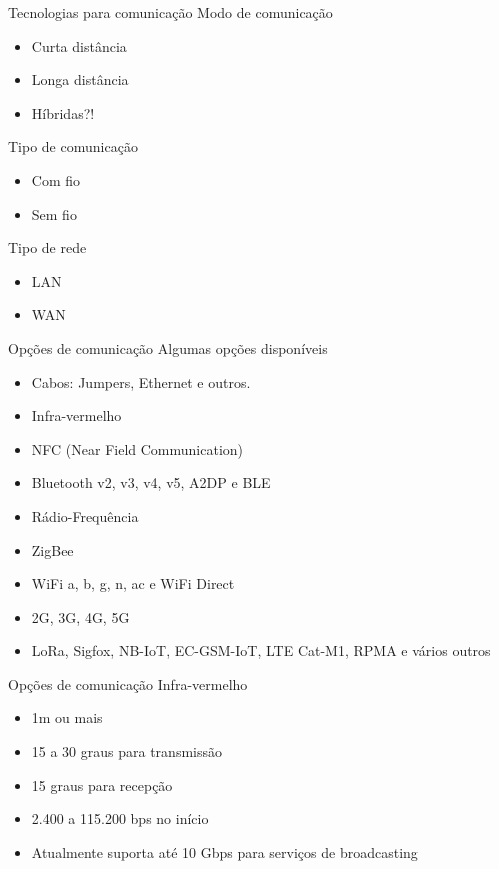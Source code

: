 \documentclass[t]{beamer}
\begin{document}
\begin{frame}{Tecnologias para comunicação}
Modo de comunicação
\begin{itemize}
	\item Curta distância
	\item Longa distância
	\item Híbridas?!
\end{itemize}
Tipo de comunicação
\begin{itemize}
	\item Com fio
	\item Sem fio
\end{itemize}
Tipo de rede
\begin{itemize}
	\item LAN
	\item WAN
\end{itemize}
\end{frame}


\begin{frame}{Opções de comunicação}
Algumas opções disponíveis
\begin{itemize}
	\item Cabos: Jumpers, Ethernet e outros.
	\item Infra-vermelho
	\item NFC (Near Field Communication)
	\item Bluetooth v2, v3, v4, v5, A2DP e BLE
	\item Rádio-Frequência
	\item ZigBee
	\item WiFi a, b, g, n, ac e WiFi Direct
	\item 2G, 3G, 4G, 5G
	\item LoRa, Sigfox, NB-IoT, EC-GSM-IoT, LTE Cat-M1, RPMA e vários outros
\end{itemize}

\end{frame}

\begin{frame}{Opções de comunicação}
Infra-vermelho
\begin{itemize}
	\item 1m ou mais
	\item 15 a 30 graus para transmissão
	\item 15 graus para recepção
	\item 2.400 a 115.200 bps no início
	\item Atualmente suporta até 10 Gbps para serviços de broadcasting
\end{itemize}

\end{frame}
\end{document}
